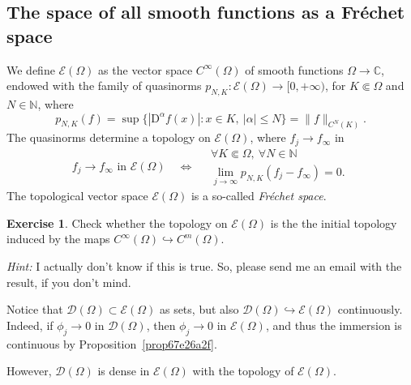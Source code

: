 \documentclass[a4paper,9pt]{amsart}
\newcommand{\scr}[1]{\mathscr{#1}}
\newcommand{\N}{\mathbb{N}}	%
\newcommand{\C}{\mathbb{C}}	%
\newcommand{\Diff}{\mathrm{D}}
\newcommand{\into}{\hookrightarrow}		%
\newcommand{\IFF}{\Leftrightarrow}	%
\theoremstyle{plain}
\theoremstyle{definition}
\newtheorem{exercise}[proposition]{Exercise}%
\theoremstyle{remark}
\begin{document}

\subsection{The space of all smooth functions as a Fréchet space}\label{subs67eb97bc}
We define $\scr E(\Omega)$ as the vector space $C^\infty(\Omega)$ of smooth functions $\Omega\to\C$, endowed with the family of quasinorms
$p_{N,K}:\scr E(\Omega)\to [0,+\infty)$, for $K\Subset\Omega$ and $N\in\N$, where
\begin{equation}
	p_{N,K} (f) = \sup\{|\Diff^\alpha f(x)|:x\in K,\ |\alpha|\le N\} = \|f\|_{C^N(K)} .
\end{equation}
The quasinorms determine a topology on $\scr E(\Omega)$, where $f_j\to f_\infty$ in 
\begin{equation}
	f_j\to f_\infty \text{ in }\scr E(\Omega)
	\quad\IFF\quad
	\begin{array}{c}
	\forall K\Subset \Omega,\ \forall N\in\N\\
	\lim_{j\to\infty} p_{N,K} (f_j-f_\infty) = 0 .
	\end{array}
\end{equation}
The topological vector space $\scr E(\Omega)$ is a so-called \emph{Fréchet space}.

\begin{exercise}
	Check whether the topology on $\scr E(\Omega)$ is the the initial topology induced by the maps $C^\infty(\Omega)\into C^m(\Omega)$.
	
	{\it Hint:} I actually don't know if this is true. So, please send me an email with the result, if you don't mind.
\end{exercise}

Notice that $\scr D(\Omega)\subset\scr E(\Omega)$ as sets, but also $\scr D(\Omega)\into\scr E(\Omega)$ continuously.
Indeed, if $\phi_j\to0$ in $\scr D(\Omega)$, then $\phi_j\to0$ in $\scr E(\Omega)$, 
and thus the immersion is continuous by Proposition~\ref{prop67e26a2f}.

However, $\scr D(\Omega)$ is dense in $\scr E(\Omega)$ with the topology of $\scr E(\Omega)$.
\end{document}
